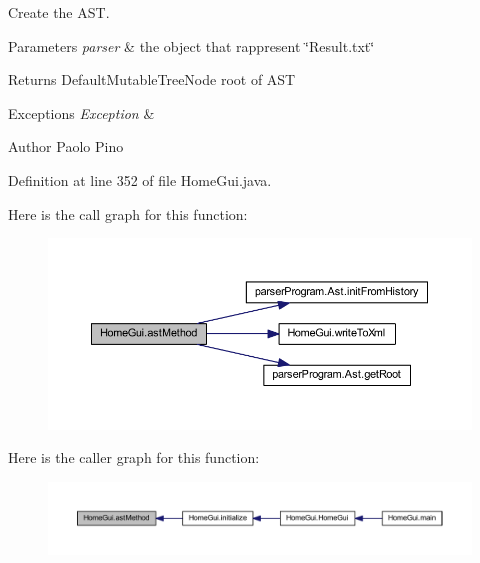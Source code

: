 Create the A\-S\-T. 


\begin{DoxyParams}{Parameters}
{\em parser} & the object that rappresent \char`\"{}\-Result.\-txt\char`\"{} \\
\hline
\end{DoxyParams}
\begin{DoxyReturn}{Returns}
Default\-Mutable\-Tree\-Node root of A\-S\-T 
\end{DoxyReturn}

\begin{DoxyExceptions}{Exceptions}
{\em Exception} & \\
\hline
\end{DoxyExceptions}
\begin{DoxyAuthor}{Author}
Paolo Pino 
\end{DoxyAuthor}


Definition at line 352 of file Home\-Gui.\-java.



Here is the call graph for this function\-:\nopagebreak
\begin{figure}[H]
\begin{center}
\leavevmode
\includegraphics[width=350pt]{class_home_gui_ac44ac869c6c437c200139d79f9f9b027_cgraph}
\end{center}
\end{figure}




Here is the caller graph for this function\-:\nopagebreak
\begin{figure}[H]
\begin{center}
\leavevmode
\includegraphics[width=350pt]{class_home_gui_ac44ac869c6c437c200139d79f9f9b027_icgraph}
\end{center}
\end{figure}



